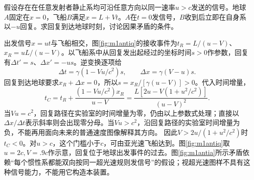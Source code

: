\begin{exercise}[选做]\label{ex:m1antitelephone}
假设存在在任意发射者静止系均可沿任意方向以同一速率$u>c$发送的信号。地球$A$固定在$x=0$，飞船$B$满足$x=L+Vt$。$A$在$t=0$发信号，$B$收到后立即在自身系以$-u$回复。求回复到达地球时刻，讨论因果矛盾的条件。
\end{exercise}
\begin{solution}
出发信号$x=ut$与飞船相交，图\ref{fig:m1antiq}的接收事件为$t_R=L/(u-V)$、$x_R=uL/(u-V)$。以飞船系中从回复发出起经过的坐标时间$s>0$作参数，回复有$\Delta t'=s$、$\Delta x'=-us$。逆变换逐项给
\[
 \Delta t=\gamma(1-Vu/c^2)s,\qquad
 \Delta x=\gamma(V-u)s.
\]
回复到达地球要求$x_R+\Delta x=0$，所以$s=x_R/[\gamma(u-V)]>0$。代入时间增量，
\[
 t_C=t_R+\frac{(1-Vu/c^2)x_R}{u-V}
 =\frac{L[2u-V(1+u^2/c^2)]}{(u-V)^2}.
\]
当$Vu=c^2$，回复路径在实验室的时间增量为零，仍由以上参数式处理；直接以$\Delta x/\Delta t$表示斜率则会出现零分母。当$Vu>c^2$，沿回复路径的实验室时间增量为负，不能再用面向未来的普通速度图像解释其方向。
因此$V>2u/(1+u^2/c^2)$时$t_C<0$。对$u>c$，这个门槛小于$c$，可由亚光速飞船达到。图\ref{fig:m1antiq}取$u=2c,V=.9c$作示意，回复位于地球出发事件的过去。图\ref{fig:m1antia}所示矛盾依赖“每个惯性系都能双向按同一超光速规则发信号”的假设；视超光速图样不具有这种信号能力，不能用它构造本装置。
\end{solution}
